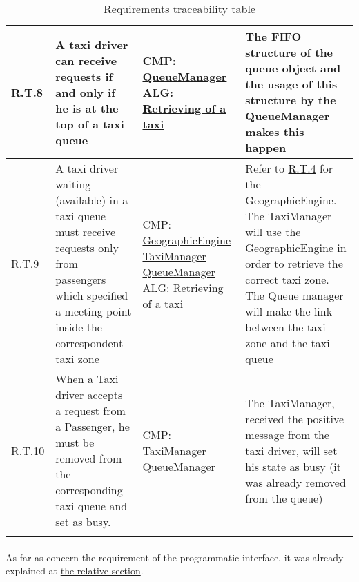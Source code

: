 \begin{center}
\begin{longtable}{|p{}|p{}|>{\raggedright\arraybackslash}p{}|>{\raggedright\arraybackslash}p{}|}
R.T.8 & A taxi driver can receive requests if and only if he is at the top of a taxi queue & CMP: \linebreak \hyperref[comp:queueManager]{QueueManager} \linebreak ALG:  \linebreak \hyperref[alg:retrievingOfATaxi]{Retrieving of a taxi} & The FIFO structure of the queue object and the usage of this structure by the QueueManager makes this happen \\ \hline
R.T.9 & A taxi driver waiting (available) in a taxi queue must receive requests only from passengers which specified a meeting point inside the correspondent taxi zone & CMP: \linebreak \hyperref[comp:geographicEngine]{GeographicEngine} \linebreak \hyperref[comp:taxiManager]{TaxiManager} \linebreak \hyperref[comp:queueManager]{QueueManager} \linebreak ALG: \linebreak \hyperref[alg:retrievingOfATaxi]{Retrieving of a taxi} & Refer to \hyperref[R.T.4]{R.T.4} for the GeographicEngine. \linebreak The TaxiManager will use the GeographicEngine in order to retrieve the correct taxi zone. \linebreak The Queue manager will make the link between the taxi zone and the taxi queue  \\ \hline
R.T.10 & When a Taxi driver accepts a request from a Passenger, he must be removed from the corresponding taxi queue and set as busy. & CMP: \linebreak \hyperref[comp:taxiManager]{TaxiManager} \linebreak \hyperref[comp:queueManager]{QueueManager} & The TaxiManager, received the positive message from the taxi driver, will set his state as busy (it was already removed from the queue) \\ \hline
\caption{Requirements traceability table} 
\label{tab:reqTraceTable}
\end{longtable} 
\end{center}
\paragraph{} As far as concern the requirement of the programmatic interface, it was already explained at \hyperref[design:programmaticInterface]{the relative section}.